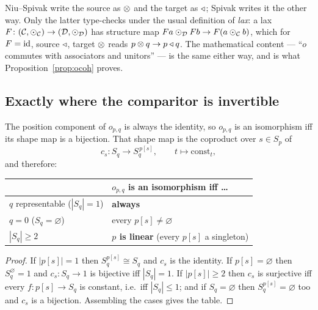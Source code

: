 \begin{Remark}
Niu--Spivak \cite[Ex.~6.85]{NiuSpivak} write the source as $\mathbin{\otimes}$ and the target
as $\mathbin{\triangleleft}$; Spivak \cite[eq.~(32)]{SpivakRef} writes it the other way. Only the
latter type-checks under the usual definition of \emph{lax}: a lax
$F\colon(\mathcal C,\mathbin{\odot}_{\mathcal C})\to(\mathcal D,\mathbin{\odot}_{\mathcal D})$ has
structure map $Fa\mathbin{\odot}_{\mathcal D}Fb\to F(a\mathbin{\odot}_{\mathcal C}b)$, which for
$F=\mathrm{id}$, source $\mathbin{\triangleleft}$, target $\mathbin{\otimes}$ reads $p\mathbin{\otimes} q\to p\mathbin{\triangleleft} q$. The
mathematical content --- ``$o$ commutes with associators and unitors'' --- is the
same either way, and is what Proposition~\ref{prop:ocoh} proves.
\end{Remark}

\subsection{Exactly where the comparitor is invertible}

\begin{Proposition}[Trichotomy]\label{prop:tricho}
The position component of $o_{p,q}$ is always the identity, so $o_{p,q}$ is an
isomorphism iff its shape map is a bijection. That shape map is the coproduct
over $s\in S_p$ of
\[
   c_s\colon S_q\longrightarrow S_q^{\,p[s]},\qquad t\mapsto\mathrm{const}_t ,
\]
and therefore:
\begin{center}
\begin{tabular}{@{}ll@{}}
\toprule
 & $o_{p,q}$ is an isomorphism iff \dots\\
\midrule
$q$ representable ($|S_q|=1$) & \textbf{always}\\
$q=0$ ($S_q=\varnothing$) & every $p[s]\neq\varnothing$\\
$|S_q|\ge 2$ & \textbf{$p$ is linear} (every $p[s]$ a singleton)\\
\bottomrule
\end{tabular}
\end{center}
\end{Proposition}

\begin{proof}
If $|p[s]|=1$ then $S_q^{p[s]}\cong S_q$ and $c_s$ is the identity. If
$p[s]=\varnothing$ then $S_q^{\varnothing}=1$ and $c_s\colon S_q\to 1$ is
bijective iff $|S_q|=1$. If $|p[s]|\ge 2$ then $c_s$ is surjective iff every
$f\colon p[s]\to S_q$ is constant, i.e.\ iff $|S_q|\le 1$; and if
$S_q=\varnothing$ then $S_q^{p[s]}=\varnothing$ too and $c_s$ is a bijection.
Assembling the cases gives the table.
\end{proof}

